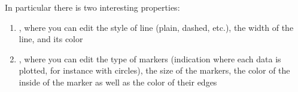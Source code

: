 In particular there is two interesting properties:
\begin{enumerate}
	\item {}, where you can edit the style of line (plain, dashed, etc.), the width of the line, and its color
	\item {}, where you can edit the type of markers (indication where each data is plotted, for instance with circles), the size of the markers, the color of the inside of the marker as well as the color of their edges
\end{enumerate}








